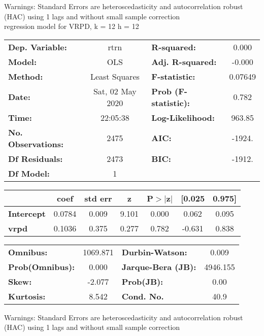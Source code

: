 Warnings: \newline
 [1] Standard Errors are heteroscedasticity and autocorrelation robust (HAC) using 1 lags and without small sample correction\\ 

regression model for VRPD, k = 12 h = 12\begin{center}
\begin{tabular}{lclc}
\toprule
\textbf{Dep. Variable:}    &       rtrn       & \textbf{  R-squared:         } &     0.000   \\
\textbf{Model:}            &       OLS        & \textbf{  Adj. R-squared:    } &    -0.000   \\
\textbf{Method:}           &  Least Squares   & \textbf{  F-statistic:       } &   0.07649   \\
\textbf{Date:}             & Sat, 02 May 2020 & \textbf{  Prob (F-statistic):} &    0.782    \\
\textbf{Time:}             &     22:05:38     & \textbf{  Log-Likelihood:    } &    963.85   \\
\textbf{No. Observations:} &        2475      & \textbf{  AIC:               } &    -1924.   \\
\textbf{Df Residuals:}     &        2473      & \textbf{  BIC:               } &    -1912.   \\
\textbf{Df Model:}         &           1      & \textbf{                     } &             \\
\bottomrule
\end{tabular}
\begin{tabular}{lcccccc}
                   & \textbf{coef} & \textbf{std err} & \textbf{z} & \textbf{P$> |$z$|$} & \textbf{[0.025} & \textbf{0.975]}  \\
\midrule
\textbf{Intercept} &       0.0784  &        0.009     &     9.101  &         0.000        &        0.062    &        0.095     \\
\textbf{vrpd}      &       0.1036  &        0.375     &     0.277  &         0.782        &       -0.631    &        0.838     \\
\bottomrule
\end{tabular}
\begin{tabular}{lclc}
\textbf{Omnibus:}       & 1069.871 & \textbf{  Durbin-Watson:     } &    0.009  \\
\textbf{Prob(Omnibus):} &   0.000  & \textbf{  Jarque-Bera (JB):  } & 4946.155  \\
\textbf{Skew:}          &  -2.077  & \textbf{  Prob(JB):          } &     0.00  \\
\textbf{Kurtosis:}      &   8.542  & \textbf{  Cond. No.          } &     40.9  \\
\bottomrule
\end{tabular}
\end{center}

Warnings: \newline
 [1] Standard Errors are heteroscedasticity and autocorrelation robust (HAC) using 1 lags and without small sample correction\\ 

